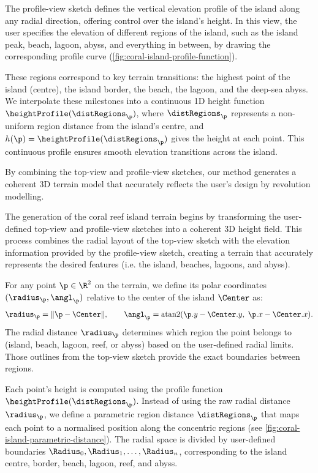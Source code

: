 The profile-view sketch defines the vertical elevation profile of the island along any radial direction, offering control over the island's height. In this view, the user specifies the elevation of different regions of the island, such as the island peak, beach, lagoon, abyss, and everything in between, by drawing the corresponding profile curve (\cref{fig:coral-island-profile-function}).

These regions correspond to key terrain transitions: the highest point of the island (centre), the island border, the beach, the lagoon, and the deep-sea abyss. We interpolate these milestones into a continuous 1D height function $\heightProfile(\distRegions_\p)$, where $\distRegions_\p$ represents a non-uniform region distance from the island's centre, and $h(\p) = \heightProfile(\distRegions_\p)$ gives the height at each point. This continuous profile ensures smooth elevation transitions across the island.

By combining the top-view and profile-view sketches, our method generates a coherent 3D terrain model that accurately reflects the user's design by revolution modelling.

The generation of the coral reef island terrain begins by transforming the user-defined top-view and profile-view sketches into a coherent 3D height field. This process combines the radial layout of the top-view sketch with the elevation information provided by the profile-view sketch, creating a terrain that accurately represents the desired features (i.e. the island, beaches, lagoons, and abyss).

For any point $\p \in \R^2$ on the terrain, we define its polar coordinates $(\radius_\p, \angl_\p)$ relative to the center of the island $\Center$ as:
\begin{align*}
    \radius_\p = \|\p - \Center\|, \qquad \angl_\p = \operatorname{atan2}(\p.y - \Center.y,\; \p.x - \Center.x).
\end{align*}
The radial distance $\radius_\p$ determines which region the point belongs to (island, beach, lagoon, reef, or abyss) based on the user-defined radial limits. Those outlines from the top-view sketch provide the exact boundaries between regions.

Each point's height is computed using the profile function $\heightProfile(\distRegions_\p)$. Instead of using the raw radial distance $\radius_\p$, we define a parametric region distance $\distRegions_\p$ that maps each point to a normalised position along the concentric regions (see \cref{fig:coral-island-parametric-distance}). The radial space is divided by user-defined boundaries $\Radius_0, \Radius_1, \dots, \Radius_n$, corresponding to the island centre, border, beach, lagoon, reef, and abyss.

